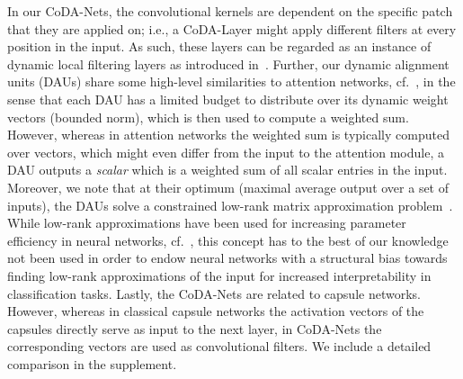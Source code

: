  In our CoDA-Nets, the convolutional kernels are dependent on the specific patch that they are applied on; i.e., a CoDA-Layer might apply different filters at every position in the input. As such, these layers can be regarded as an instance of dynamic local filtering layers as introduced in~\cite{jia2016dynamic}.
Further, our dynamic alignment units (DAUs) share some high-level similarities to attention networks, cf.~\cite{xu2015show}, in the sense that each DAU has a limited budget to distribute over its dynamic weight vectors (bounded norm), which is then used to compute a weighted sum. However, whereas in attention networks the weighted sum is typically computed over vectors, which might even differ from the input to the attention module, a DAU outputs a \emph{scalar} which is a weighted sum of all scalar entries in the input. Moreover, we note that at their optimum (maximal average output over a set of inputs), the DAUs solve a constrained low-rank matrix approximation problem~\cite{eckart1936approximation}. While low-rank approximations have been used for increasing parameter efficiency in neural networks, cf.~\cite{yu2017compressing}, this concept has to the best of our knowledge not been used in order to endow neural networks with a structural bias towards finding low-rank approximations of the input for increased interpretability in classification tasks. Lastly, the CoDA-Nets 
are related to capsule networks. However, whereas in classical capsule networks the activation vectors of the capsules directly serve as input to the next layer, in CoDA-Nets the corresponding vectors are used as convolutional filters. 
We include a detailed comparison in the supplement. 